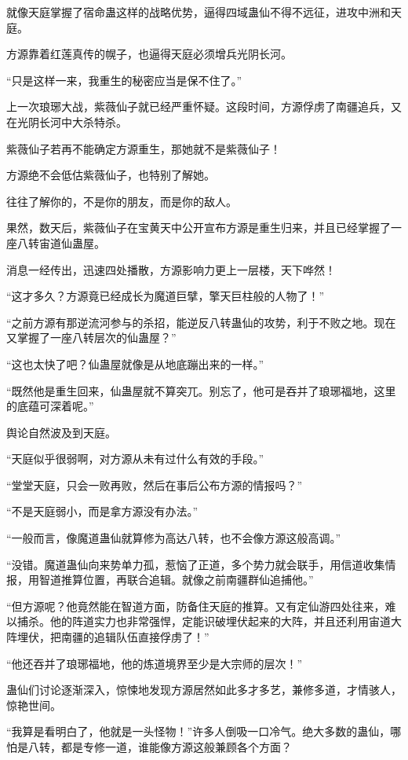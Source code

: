 \begin{this_body}
就像天庭掌握了宿命蛊这样的战略优势，逼得四域蛊仙不得不远征，进攻中洲和天庭。

方源靠着红莲真传的幌子，也逼得天庭必须增兵光阴长河。

“只是这样一来，我重生的秘密应当是保不住了。”

上一次琅琊大战，紫薇仙子就已经严重怀疑。这段时间，方源俘虏了南疆追兵，又在光阴长河中大杀特杀。

紫薇仙子若再不能确定方源重生，那她就不是紫薇仙子！

方源绝不会低估紫薇仙子，也特别了解她。

往往了解你的，不是你的朋友，而是你的敌人。

果然，数天后，紫薇仙子在宝黄天中公开宣布方源是重生归来，并且已经掌握了一座八转宙道仙蛊屋。

消息一经传出，迅速四处播散，方源影响力更上一层楼，天下哗然！

“这才多久？方源竟已经成长为魔道巨擘，擎天巨柱般的人物了！”

“之前方源有那逆流河参与的杀招，能逆反八转蛊仙的攻势，利于不败之地。现在又掌握了一座八转层次的仙蛊屋？”

“这也太快了吧？仙蛊屋就像是从地底蹦出来的一样。”

“既然他是重生回来，仙蛊屋就不算突兀。别忘了，他可是吞并了琅琊福地，这里的底蕴可深着呢。”

舆论自然波及到天庭。

“天庭似乎很弱啊，对方源从未有过什么有效的手段。”

“堂堂天庭，只会一败再败，然后在事后公布方源的情报吗？”

“不是天庭弱小，而是拿方源没有办法。”

“一般而言，像魔道蛊仙就算修为高达八转，也不会像方源这般高调。”

“没错。魔道蛊仙向来势单力孤，惹恼了正道，多个势力就会联手，用信道收集情报，用智道推算位置，再联合追辑。就像之前南疆群仙追捕他。”

“但方源呢？他竟然能在智道方面，防备住天庭的推算。又有定仙游四处往来，难以捕杀。他的阵道实力也非常强悍，定能识破埋伏起来的大阵，并且还利用宙道大阵埋伏，把南疆的追辑队伍直接俘虏了！”

“他还吞并了琅琊福地，他的炼道境界至少是大宗师的层次！”

蛊仙们讨论逐渐深入，惊悚地发现方源居然如此多才多艺，兼修多道，才情骇人，惊艳世间。

“我算是看明白了，他就是一头怪物！”许多人倒吸一口冷气。绝大多数的蛊仙，哪怕是八转，都是专修一道，谁能像方源这般兼顾各个方面？


\end{this_body}
